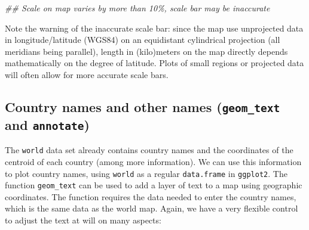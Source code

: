 \documentclass[
  letterpaper,
  DIV=11,
  numbers=noendperiod]{scrartcl}
\newenvironment{Shaded}{\begin{snugshade}}{\end{snugshade}}
\newcommand{\DocumentationTok}[1]{\textcolor[rgb]{0.37,0.37,0.37}{\textit{#1}}}
\begin{document}
\begin{Shaded}
\begin{Highlighting}[]
\DocumentationTok{\#\# Scale on map varies by more than 10\%, scale bar may be inaccurate }
\end{Highlighting}
\end{Shaded}

Note the warning of the inaccurate scale bar: since the map use
unprojected data in longitude/latitude (WGS84) on an equidistant
cylindrical projection (all meridians being parallel), length in
(kilo)meters on the map directly depends mathematically on the degree of
latitude. Plots of small regions or projected data will often allow for
more accurate scale bars.

\hypertarget{country-names-and-other-names-geom_text-and-annotate}{%
\subsection{\texorpdfstring{Country names and other names
(\texttt{geom\_text} and
\texttt{annotate})}{Country names and other names (geom\_text and annotate)}}\label{country-names-and-other-names-geom_text-and-annotate}}

The \texttt{world} data set already contains country names and the
coordinates of the centroid of each country (among more information). We
can use this information to plot country names, using \texttt{world} as
a regular \texttt{data.frame} in \texttt{ggplot2}. The function
\texttt{geom\_text} can be used to add a layer of text to a map using
geographic coordinates. The function requires the data needed to enter
the country names, which is the same data as the world map. Again, we
have a very flexible control to adjust the text at will on many aspects:
\end{document}
